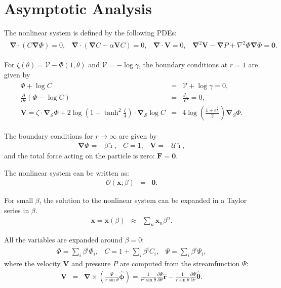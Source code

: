\documentclass[10pt]{ijnam}
\newcommand{\deriv}[2]{\frac{\partial #1}{\partial #2}}
\newcommand{\pars}[1]{\left(#1\right)}
\newcommand\Laplacian{\nabla^2}
\newcommand\bnabla{\boldsymbol{\nabla}}
\newcommand\bLaplacian{\boldsymbol{\nabla}^2}
\newcommand\bV{\boldsymbol{V}}
\newcommand\bF{\boldsymbol{F}}
\newcommand\bx{\boldsymbol{x}}
\newcommand\br{\boldsymbol{r}}
\newcommand\brhat{\hat{\br}}
\newcommand\btheta{\boldsymbol{\theta}}
\newcommand\bthetahat{\hat{\btheta}}
\newcommand\bphi{\boldsymbol{\phi}}
\newcommand\bphihat{\hat{\bphi}}
\newcommand\bzero{\boldsymbol{0}}
\newcommand\cO{\mathcal{O}}
\newcommand\cU{\mathscr{U}}
\newcommand\cV{\mathscr{V}}
\newcommand\ui{\boldsymbol{\hat{\imath}}}
\begin{document}
\section{Asymptotic Analysis} \label{sec:asymp}
The nonlinear system is defined by the following PDEs:
\label{PDEs}
\begin{eqnarray*}
\begin{array}{cccc}
\bnabla \cdot \pars{C \bnabla \varPhi} = 0, &
\bnabla \cdot \pars{\bnabla C - \alpha \bV C} = 0, &
\bnabla \cdot \bV = 0, &
\bLaplacian \bV - \bnabla P + \Laplacian \varPhi \bnabla \varPhi = \bzero.
\end{array}\end{eqnarray*}

For $\zeta(\theta) = \cV - \varPhi(1, \theta)$ and 
$\cV = -\log \gamma$, the boundary conditions at $r = 1$ are given by
\begin{eqnarray*}
\begin{array}{rcl}
\varPhi + \log C &=& \cV + \log \gamma = 0, \\
\deriv{}{r}\pars{\varPhi - \log C} &=& \frac{J_-}{C} = 0, \\
\bV = \zeta \cdot \bnabla_\mathcal{S} \varPhi 
+ 2\log\pars{1-\tanh^2\frac{\zeta}{4}} \cdot \bnabla_\mathcal{S} \log C
&=& 4\log\pars{\frac{1 + e^\frac{\zeta}{2}}{2}} \bnabla_S \varPhi.
\end{array}
\end{eqnarray*}

The boundary conditions for $r \rightarrow \infty$ are given by
\begin{eqnarray*}
\bnabla \varPhi = -\beta \ui, &
C = 1, &
\bV = -\cU \ui,
\end{eqnarray*}
and the total force acting on the particle is zero: $\bF = \bzero$.

The nonlinear system can be written as: 
\begin{eqnarray*}
\cO(\bx;\beta) &=& \bzero.
\end{eqnarray*}

For small $\beta$, the solution to the nonlinear system can be expanded in a Taylor series in $\beta$.
\begin{eqnarray*}
\bx = \bx(\beta) &\approx& \sum_n \bx_n \beta^n.
\end{eqnarray*}

All the variables are expanded around $\beta = 0$:
\begin{eqnarray*}
\varPhi = \sum_i \beta^i \varPhi_i, &
C = 1 + \sum_i \beta^i C_i, &
\Psi = \sum_i \beta^i \Psi_i,
\end{eqnarray*}
where the velocity $\bV$ and pressure $P$ are computed from the streamfunction $\Psi$:
\begin{eqnarray*}
\bV &=& \bnabla \times \pars{\frac{\Psi}{r \sin\theta} \bphihat} 
= \frac{1}{r^2 \sin\theta} \deriv{\Psi}{\theta} \brhat 
- \frac{1}{r \sin\theta} \deriv{\Psi}{r} \bthetahat.
\end{eqnarray*}
\end{document}
